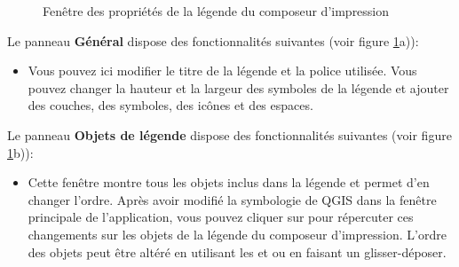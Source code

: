 \begin{figure}[h]
\centering
   \hspace{1cm}
   \hspace{1cm}
   \caption{Fenêtre des propriétés de la légende du composeur d'impression \nixcaption}\label{fig:legendoptions}
\end{figure}


Le panneau \textbf{Général} dispose des fonctionnalités suivantes (voir figure \ref{fig:legendoptions}a)):

\begin{itemize}[label=--]
\item Vous pouvez ici modifier le titre de la légende et la police utilisée. Vous pouvez changer la hauteur et la largeur des symboles de la légende et ajouter des couches, des symboles, des icônes et des espaces.
\end{itemize}


Le panneau \textbf{Objets de légende} dispose des fonctionnalités suivantes (voir figure \ref{fig:legendoptions}b)):

\begin{itemize}[label=--]
\item Cette fenêtre montre tous les objets inclus dans la légende et permet d'en changer l'ordre. Après avoir modifié la symbologie de QGIS dans la fenêtre principale de l'application, vous pouvez cliquer sur  pour répercuter ces changements sur les objets de la légende du composeur d'impression. L'ordre des objets peut être altéré en utilisant les  et  ou en faisant un glisser-déposer.
\end{itemize}


